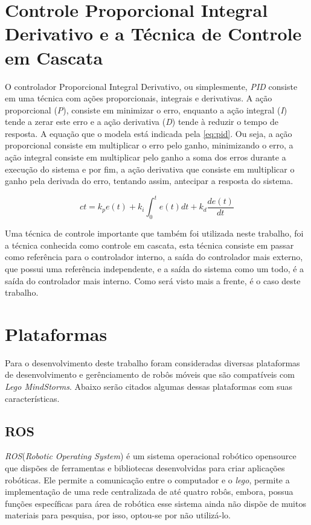 \section{Controle Proporcional Integral Derivativo e a Técnica de Controle em Cascata}
\label{sec:pid}
O controlador Proporcional Integral Derivativo, ou simplesmente, \emph{PID} consiste em uma técnica com ações proporcionais, integrais e derivativas. A ação proporcional (\emph{P}), consiste em minimizar o erro, enquanto a ação integral (\emph{I}) tende a zerar este erro e a ação derivativa (\emph{D}) tende à reduzir o tempo de resposta. A equação que o modela está indicada pela \autoref{eq:pid}. Ou seja, a ação proporcional consiste em multiplicar o erro pelo ganho, minimizando o erro, a ação integral consiste em multiplicar pelo ganho a soma dos erros durante a execução do sistema e por fim, a ação derivativa que consiste em multiplicar o ganho pela derivada do erro, tentando assim, antecipar a resposta do sistema. 

\begin{equation}
c{t} = k_{p}e(t) + k_{i}\int_0^t e(t) dt + k_{d}\dfrac{de(t)}{dt}
\label{eq:pid}
\end{equation}

Uma técnica de controle importante que também foi utilizada neste trabalho, foi a técnica conhecida como controle em cascata, esta técnica consiste em passar como referência para o controlador interno, a saída do controlador mais externo, que possui uma referência independente, e a saída do sistema como um todo, é a saída do controlador mais interno. Como será visto mais a frente, é o caso deste trabalho.

\section{Plataformas}
\label{sec:plataformas}
Para o desenvolvimento deste trabalho foram consideradas diversas plataformas de desenvolvimento e gerênciamento de robôs móveis que são compatíveis com \emph{Lego MindStorms}. Abaixo serão citados algumas dessas plataformas com suas características.

\subsection{ROS}
\label{subsec:ROS}
\emph{ROS}(\emph{Robotic Operating System}) é um sistema operacional robótico opensource que dispões de ferramentas e bibliotecas desenvolvidas para criar aplicações robóticas.%
Ele permite a comunicação entre o computador e o \emph{lego}, permite a implementação de uma rede centralizada de até quatro robôs, embora, possua funções específicas para área de robótica esse sistema ainda não dispõe de muitos materiais para pesquisa, por isso, optou-se por não  utilizá-lo.

